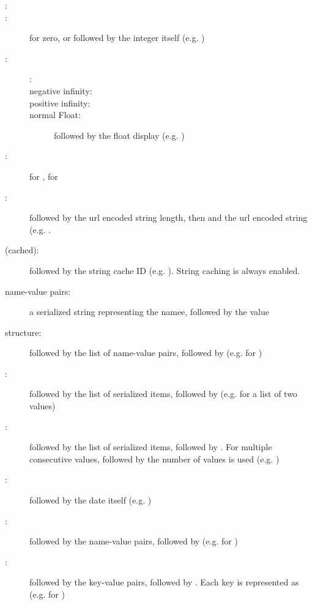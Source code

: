 \begin{description}
	\item[:] 
	\item[:]  for zero, or  followed by the integer itself (e.g. )
	\item[:]
		\begin{description}
			\item[:] 
			\item[negative infinity:] 
			\item[positive infinity:] 
			\item[normal Float:]  followed by the float display (e.g. )
		\end{description}
	\item[:]  for ,  for 
	\item[:]  followed by the url encoded string length, then \expr{:} and the url encoded string (e.g. .
	\item[ (cached):]  followed by the string cache ID (e.g. ). String caching is always enabled.
	\item[name-value pairs:] a serialized string representing the namee, followed by the value
	\item[structure:]  followed by the list of name-value pairs, followed by  (e.g.  for )
	\item[:]  followed by the list of serialized items, followed by  (e.g.  for a list of two  values)
	\item[:]  followed by the list of serialized items, followed by . For multiple consecutive  values,  followed by the number of  values is used (e.g. )
	\item[:]  followed by the date itself (e.g. )
	\item[:]  followed by the name-value pairs, followed by  (e.g.  for )
	\item[:]  followed by the key-value pairs, followed by . Each key is represented as  (e.g.  for )

\end{description}
